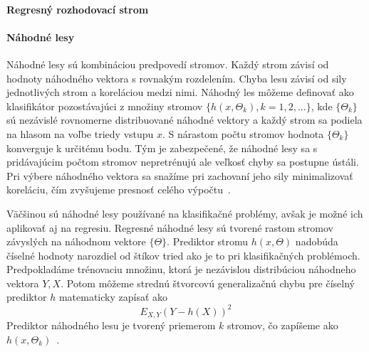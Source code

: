 \documentclass[a4paper,slovak,12pt,appendix]{article}
\begin{document}

\paragraph{Regresný rozhodovací strom}


\paragraph{Náhodné lesy}
Náhodné lesy sú kombináciou predpovedí stromov. Každý strom závisí od hodnoty
náhodného vektora s rovnakým rozdelením. Chyba lesu závisí od sily jednotlivých
strom a koreláciou medzi nimi. Náhodný les môžeme definovať ako klasifikátor
pozostávajúci z množiny stromov $\{h(x, \Theta_k), k=1, 2, ... \}$, kde
$\{\Theta_k\}$ sú nezávislé rovnomerne distribuované náhodné vektory a každý
strom sa podiela na hlasom na voľbe triedy vstupu $x$. S nárastom počtu stromov
hodnota $\{\Theta_k\}$ konverguje k určitému bodu. Tým je zabezpečené, že
náhodné lesy sa s pridávajúcim počtom stromov nepretrénujú ale veľkosť chyby sa
postupne ústáli. Pri výbere náhodného vektora sa snažíme pri zachovaní jeho
sily minimalizovať koreláciu, čím zvyšujeme presnosť celého
výpočtu~\cite{Breiman2001}.

Väčšinou sú náhodné lesy používané na klasifikačné problémy, avšak je možné ich
aplikovať aj na regresiu. Regresné náhodné lesy sú tvorené rastom stromov
závyslých na náhodnom vektore $\{\Theta\}$. Prediktor stromu $h(x, \Theta)$
nadobúda číselné hodnoty narozdiel od štíkov tried ako je to pri klasifikačných
problémoch. Predpokladáme trénovaciu množinu, ktorá je nezávislou distribúciou
náhodneho vektora $Y, X$. Potom môžeme strednú štvorcovú generalizačnú chybu
pre číselný prediktor $h$ matematicky zapísať ako
\begin{equation}
  E_{X, Y} (Y - h(X))^2
  \label{eq-random-error}
\end{equation}
Prediktor náhodného lesu je tvorený priemerom $k$ stromov, čo zapíšeme ako
$h(x, \Theta_k)$~\cite{Breiman2001}.

\end{document}
